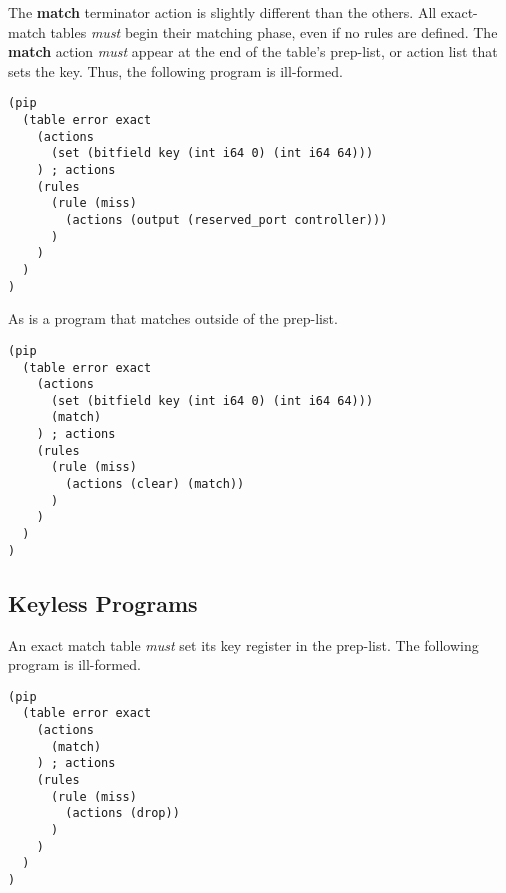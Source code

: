 The \textbf{match} terminator action is slightly different than the others. All exact-match tables \textit{must} begin their matching phase, even if no rules are defined. The \textbf{match} action \textit{must} appear at the end of the table's prep-list, or action list that sets the key. Thus, the following program is ill-formed.
\begin{verbatim}
(pip
  (table error exact
    (actions
      (set (bitfield key (int i64 0) (int i64 64)))
    ) ; actions
    (rules
      (rule (miss)
        (actions (output (reserved_port controller)))
      )
    )
  )
)
\end{verbatim}
As is a program that matches outside of the prep-list.
\begin{verbatim}
(pip
  (table error exact
    (actions
      (set (bitfield key (int i64 0) (int i64 64)))
      (match)
    ) ; actions
    (rules
      (rule (miss)
        (actions (clear) (match))
      )
    )
  )
)
\end{verbatim}

\subsection{Keyless Programs}
An exact match table \textit{must} set its key register in the prep-list. The following program is ill-formed.
\begin{verbatim}
(pip
  (table error exact
    (actions
      (match)
    ) ; actions
    (rules
      (rule (miss)
        (actions (drop))
      )
    )
  )
)
\end{verbatim}
